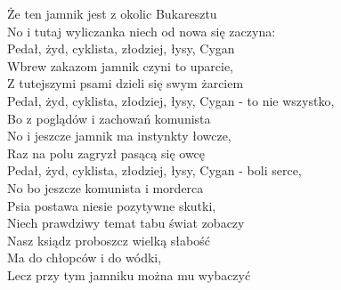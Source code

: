 \begin{flushleft}
Że ten jamnik jest z okolic Bukaresztu \\
No i tutaj wyliczanka niech od nowa się zaczyna: \\
Pedał, żyd, cyklista, złodziej, łysy, Cygan \\
\vskip 3mm
Wbrew zakazom jamnik czyni to uparcie, \\
Z tutejszymi psami dzieli się swym żarciem \\
Pedał, żyd, cyklista, złodziej, łysy, Cygan - to nie wszystko, \\
Bo z poglądów i zachowań komunista \\
\vskip 3mm
No i jeszcze jamnik ma instynkty łowcze, \\
Raz na polu zagryzł pasącą się owcę \\
Pedał, żyd, cyklista, złodziej, łysy, Cygan - boli serce, \\
No bo jeszcze komunista i morderca \\
\vskip 3mm
Psia postawa niesie pozytywne skutki, \\
Niech prawdziwy temat tabu świat zobaczy \\
Nasz ksiądz proboszcz wielką słabość \\
Ma do chłopców i do wódki, \\
Lecz przy tym jamniku można mu wybaczyć \\
\end{flushleft}
\clearpage

